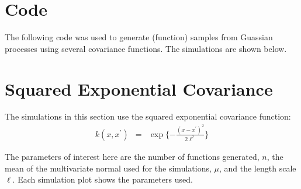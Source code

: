 \documentclass[12pt,letterpaper]{article}
\begin{document}

\section{Code}
The following code was used to generate (function) samples from Guassian processes using several covariance functions. The simulations are shown below. 



\pagebreak
\section{Squared Exponential Covariance}

The simulations in this section use the squared exponential covariance function:
\begin{eqnarray*}
k(x, x^{\prime}) &=& \exp \{ - \frac{(x - x^{\prime})^2} {2 \ell^2 } \}
\end{eqnarray*} 

The parameters of interest here are the number of functions generated, $n$, the mean of the multivariate normal used for the simulations, $\mu$, and the length scale $\ell$. Each simulation plot shows the parameters used. 
\end{document}
